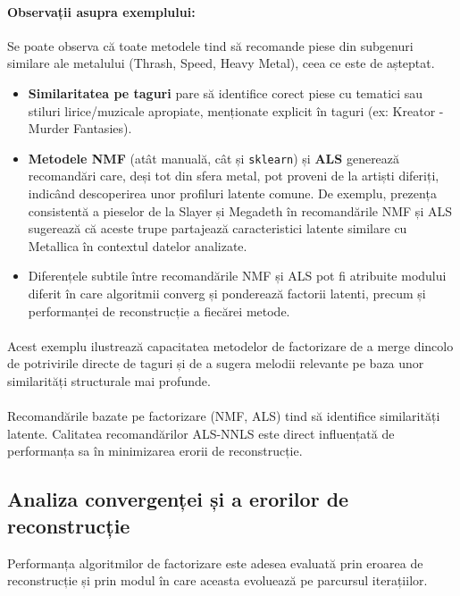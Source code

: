 \documentclass[12pt,a4paper]{article}
\begin{document}
\paragraph{Observații asupra exemplului:}
Se poate observa că toate metodele tind să recomande piese din subgenuri similare ale metalului (Thrash, Speed, Heavy Metal), ceea ce este de așteptat.
\begin{itemize}
	\item \textbf{Similaritatea pe taguri} pare să identifice corect piese cu tematici sau stiluri lirice/muzicale apropiate, menționate explicit în taguri (ex: Kreator - Murder Fantasies).
	\item \textbf{Metodele NMF} (atât manuală, cât și \texttt{sklearn}) și \textbf{ALS} generează recomandări care, deși tot din sfera metal, pot proveni de la artiști diferiți, indicând descoperirea unor profiluri latente comune. De exemplu, prezența consistentă a pieselor de la Slayer și Megadeth în recomandările NMF și ALS sugerează că aceste trupe partajează caracteristici latente similare cu Metallica în contextul datelor analizate.
	\item Diferențele subtile între recomandările NMF și ALS pot fi atribuite modului diferit în care algoritmii converg și ponderează factorii latenti, precum și performanței de reconstrucție a fiecărei metode.
\end{itemize}
\paragraph{}{Acest exemplu ilustrează capacitatea metodelor de factorizare de a merge dincolo de potrivirile directe de taguri și de a sugera melodii relevante pe baza unor similarități structurale mai profunde.}
\paragraph{}{Recomandările bazate pe factorizare (NMF, ALS) tind să identifice similarități latente. Calitatea recomandărilor ALS-NNLS este direct influențată de performanța sa în minimizarea erorii de reconstrucție.}

\subsection{Analiza convergenței și a erorilor de reconstrucție}
\label{subsec:convergenta-erori} %

Performanța algoritmilor de factorizare este adesea evaluată prin eroarea de reconstrucție și prin modul în care aceasta evoluează pe parcursul iterațiilor.
\end{document}
